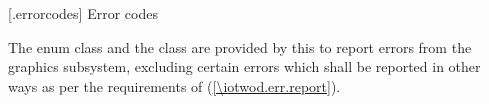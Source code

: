
 [\iotwod.errorcodes] {Error codes}

\pnum
The  enum class and the  class are provided by this \documenttypename{} to report errors from the graphics subsystem, excluding certain errors which shall be reported in other ways as per the requirements of (\ref{\iotwod.err.report}).

\addtocounter{SectionDepthBase}{1}


\addtocounter{SectionDepthBase}{-1}
